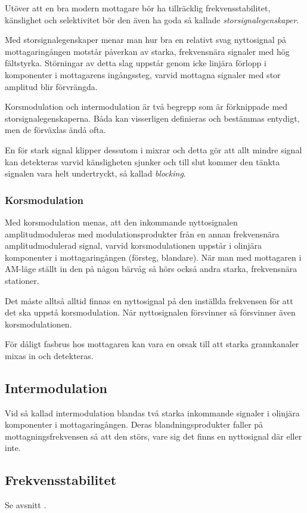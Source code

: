Utöver att en bra modern mottagare bör ha tillräcklig frekvensstabilitet,
känslighet och selektivitet bör den även ha goda så kallade
\emph{storsignalegenskaper}.

Med storsignalegenskaper menar man hur bra en relativt svag nyttosignal på
mottagaringången motstår påverkan av starka, frekvensnära signaler med hög
fältstyrka.
Störningar av detta slag uppstår genom icke linjära förlopp i komponenter i
mottagarens ingångssteg, varvid mottagna signaler med stor amplitud blir
förvrängda.

Korsmodulation och intermodulation är två begrepp som är förknippade
med storsignalegenskaperna.
Båda kan visserligen definieras och bestämmas entydigt, men de förväxlas ändå
ofta.

En för stark signal klipper dessutom i mixrar och detta gör att allt mindre
signal kan detekteras varvid känsligheten sjunker och till slut kommer den
tänkta signalen vara helt undertryckt, så kallad \emph{blocking}.

\subsubsection{Korsmodulation}

Med korsmodulation menas, att den inkommande nyttosignalen amplitudmoduleras
med modulationsprodukter från en annan frekvensnära amplitudmodulerad signal,
varvid korsmodulationen uppstår i olinjära komponenter i mottagaringången
(försteg, blandare).
När man med mottagaren i AM-läge ställt in den på någon bärvåg så hörs också
andra starka, frekvensnära stationer.

Det måste alltså alltid finnas en nyttosignal på den inställda frekvensen för
att det ska uppstå korsmodulation.
När nyttosignalen försvinner så försvinner även korsmodulationen.

För dåligt fasbrus hos mottagaren kan vara en orsak till att starka
grannkanaler mixas in och detekteras.

\subsection{Intermodulation}

Vid så kallad intermodulation blandas två starka inkommande signaler i olinjära
komponenter i mottagaringången.
Deras blandningsprodukter faller på mottagningsfrekvensen så att den störs,
vare sig det finns en nyttosignal där eller inte.

\subsection{Frekvensstabilitet}

Se avsnitt .
